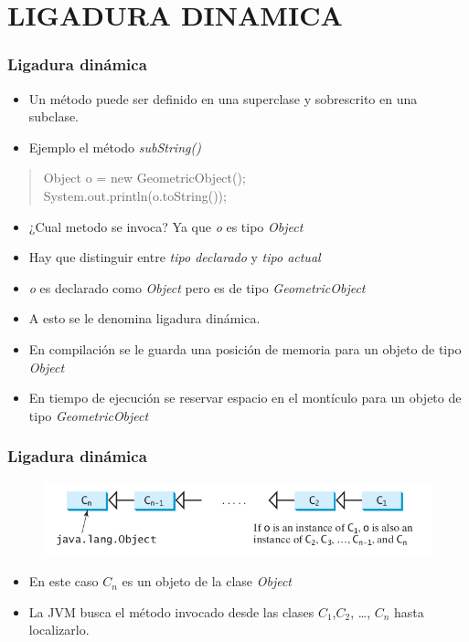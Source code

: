 \documentclass{beamer}
\begin{document}
\section{LIGADURA DINAMICA}
\begin{frame}
\frametitle{Ligadura dinámica}
\begin{itemize}[<+->]
\item Un método puede ser definido en una superclase y sobrescrito en una subclase.
\item Ejemplo el método \emph{subString()}
\end{itemize}
\pause
\begin{quote}
Object o = new GeometricObject();\\
System.out.println(o.toString());
\end{quote}
\pause
\begin{itemize}[<+->]
\item ¿Cual metodo se invoca? Ya que \emph{o} es tipo \emph{Object}
\item Hay que distinguir entre \emph{tipo declarado} y \emph{tipo actual}
\item \emph{o} es declarado como \emph{Object} pero es de tipo \emph{GeometricObject}
\item A esto se le denomina ligadura dinámica.
\item En compilación se le guarda una posición de memoria para un objeto de tipo \emph{Object}
\item En tiempo de ejecución se reservar espacio en el montículo para un objeto de tipo \emph{GeometricObject}
\end{itemize}
\end{frame}

\begin{frame}
\frametitle{Ligadura dinámica}
\begin{figure}
\includegraphics[scale=0.5]{imagenes/polimorfismo1.png}
\end{figure}
\pause
\begin{itemize}[<+->]
\item En este caso $C_{n}$ es un objeto de la clase \emph{Object}
\item La JVM busca el método invocado desde las clases $C_{1}$,$C_{2}$, \dots, $C_{n}$ hasta localizarlo.
\end{itemize}
\end{frame}
\end{document}
